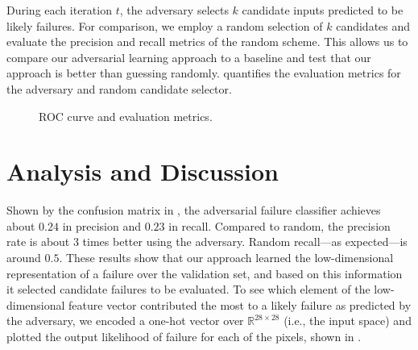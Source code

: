During each iteration $t$, the adversary selects $k$ candidate inputs predicted to be likely failures.
For comparison, we employ a random selection of $k$ candidates and evaluate the precision and recall metrics of the random scheme.
This allows us to compare our adversarial learning approach to a baseline and test that our approach is better than guessing randomly.  quantifies the evaluation metrics for the adversary and random candidate selector.



\begin{figure}[t]
    \centering
    \hspace{5mm}
    \caption{ROC curve and evaluation metrics.}
    \label{fig:roc_and_metrics}
\end{figure}


\section{Analysis and Discussion}
Shown by the confusion matrix in , the adversarial failure classifier achieves about $0.24$ in precision and $0.23$ in recall.
Compared to random, the precision rate is about $3$ times better using the adversary. Random recall---as expected---is around $0.5$.
These results show that our approach learned the low-dimensional representation of a failure over the validation set, and based on this information it selected candidate failures to be evaluated.
To see which element of the low-dimensional feature vector contributed the most to a likely failure as predicted by the adversary, we encoded a one-hot vector over $\mathbb{R}^{28\times28}$ (i.e., the input space) and plotted the output likelihood of failure for each of the pixels, shown in .

